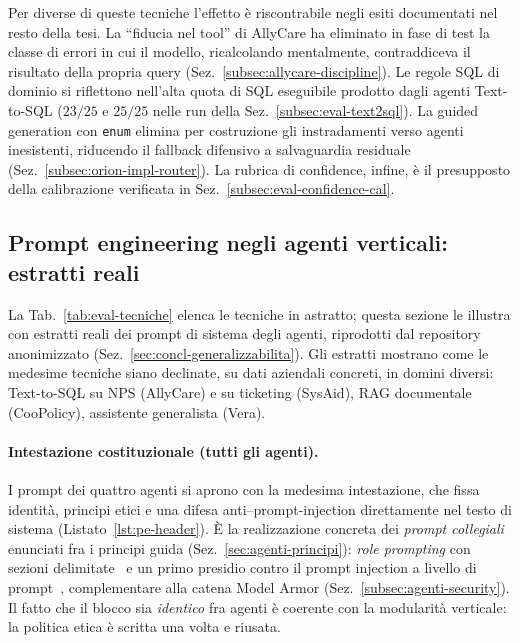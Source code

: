 Per diverse di queste tecniche l'effetto è riscontrabile negli esiti
documentati nel resto della tesi. La ``fiducia nel tool'' di AllyCare ha
eliminato in fase di test la classe di errori in cui il modello, ricalcolando
mentalmente, contraddiceva il risultato della propria query
(Sez.~\ref{subsec:allycare-discipline}). Le regole SQL di dominio si
riflettono nell'alta quota di SQL eseguibile prodotto dagli agenti
Text-to-SQL ($23/25$ e $25/25$ nelle run della Sez.~\ref{subsec:eval-text2sql}).
La guided generation con \texttt{enum} elimina per costruzione gli
instradamenti verso agenti inesistenti, riducendo il fallback difensivo a
salvaguardia residuale (Sez.~\ref{subsec:orion-impl-router}). La rubrica di
confidence, infine, è il presupposto della calibrazione verificata in
Sez.~\ref{subsec:eval-confidence-cal}.

\subsection{Prompt engineering negli agenti verticali: estratti reali}
\label{subsec:eval-prompt-estratti}

La Tab.~\ref{tab:eval-tecniche} elenca le tecniche in astratto; questa
sezione le illustra con estratti reali dei prompt di sistema degli
agenti, riprodotti dal repository anonimizzato
(Sez.~\ref{sec:concl-generalizzabilita}). Gli estratti mostrano come le
medesime tecniche siano declinate, su dati aziendali concreti, in domini
diversi: Text-to-SQL su NPS (AllyCare) e su ticketing (SysAid), RAG
documentale (CooPolicy), assistente generalista (Vera).

\paragraph{Intestazione costituzionale (tutti gli agenti).}
I prompt dei quattro agenti si aprono con la medesima intestazione, che
fissa identità, principi etici e una difesa anti--prompt-injection
direttamente nel testo di sistema (Listato~\ref{lst:pe-header}). È la
realizzazione concreta dei \emph{prompt collegiali} enunciati fra i
principi guida (Sez.~\ref{sec:agenti-principi}): \emph{role prompting}
con sezioni delimitate~\cite{sahoo2024prompteng_survey} e un primo
presidio contro il prompt injection a livello di
prompt~\cite{perez2022promptinjection}, complementare alla catena Model
Armor (Sez.~\ref{subsec:agenti-security}). Il fatto che il blocco sia
\emph{identico} fra agenti è coerente con la modularità verticale: la
politica etica è scritta una volta e riusata.

